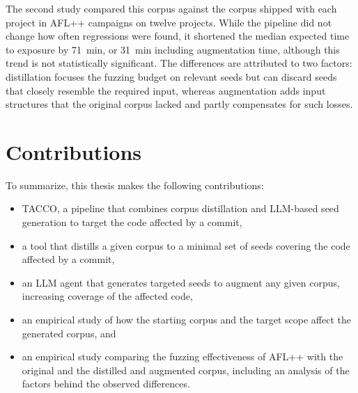 The second study compared this corpus against the corpus shipped with each project in AFL++ campaigns on twelve projects.
While the pipeline did not change how often regressions were found, it shortened the median expected time to exposure by \SI{71}{\minute}, or \SI{31}{\minute} including augmentation time, although this trend is not statistically significant.
The differences are attributed to two factors: distillation focuses the fuzzing budget on relevant seeds but can discard seeds that closely resemble the required input, whereas augmentation adds input structures that the original corpus lacked and partly compensates for such losses.

\section{Contributions}
To summarize, this thesis makes the following contributions:
\begin{itemize}
    \item TACCO, a pipeline that combines corpus distillation and \ac{LLM}-based seed generation to target the code affected by a commit,
    \item a tool that distills a given corpus to a minimal set of seeds covering the code affected by a commit,
    \item an \ac{LLM} agent that generates targeted seeds to augment any given corpus, increasing coverage of the affected code,
    \item an empirical study of how the starting corpus and the target scope affect the generated corpus, and
    \item an empirical study comparing the fuzzing effectiveness of AFL++ with the original and the distilled and augmented corpus, including an analysis of the factors behind the observed differences.
\end{itemize}